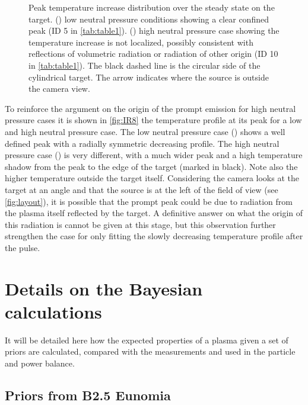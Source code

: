 \begin{figure}[!ht]
\begin{subfigure}{0.6\linewidth}
        \vspace*{-5mm}
         {\color{white}\caption{\phantom{}}\label{fig:IR8b}}
     \end{subfigure}
        \caption{Peak temperature increase distribution over the steady state on the target. () low neutral pressure conditions showing a clear confined peak (ID 5 in \autoref{tab:table1}). () high neutral pressure case showing the temperature increase is not localized, possibly consistent with reflections of volumetric radiation or radiation of other origin (ID 10 in \autoref{tab:table1}). The black dashed line is the circular side of the cylindrical target. The arrow indicates where the source is outside the camera view.}
        \label{fig:IR8}
\end{figure}

To reinforce the argument on the origin of the prompt emission for high neutral pressure cases it is shown in \autoref{fig:IR8} the temperature profile at its peak for a low and high neutral pressure case. The low neutral pressure case () shows a well defined peak with a radially symmetric decreasing profile. The high neutral pressure case () is very different, with a much wider peak and a high temperature shadow from the peak to the edge of the target (marked in black). Note also the higher temperature outside the target itself. Considering the camera looks at the target at an angle and that the source is at the left of the field of view (see \autoref{fig:layout}), it is possible that the prompt peak could be due to radiation from the plasma itself reflected by the target. A definitive answer on what the origin of this radiation is cannot be given at this stage, but this observation further strengthen the case for only fitting the slowly decreasing temperature profile after the pulse.

\section{Details on the Bayesian calculations}\label{Details on the Bayesian calculations}

It will be detailed here how the expected properties of a plasma given a set of priors are calculated, compared with the measurements and used in the particle and power balance.

\subsection{Priors from B2.5 Eunomia}\label{Priors from B2.5 Eunomia}

